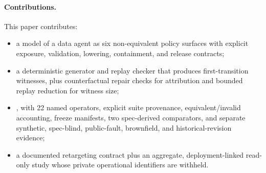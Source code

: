 \paragraph{Contributions.}
This paper contributes:

\begin{itemize}
  \item a model of a data agent as six non-equivalent policy surfaces with explicit exposure, validation, lowering, containment, and release contracts;
  \item a deterministic generator and replay checker that produces first-transition witnesses, plus counterfactual repair checks for attribution and bounded replay reduction for witness size;
  \item \bench, with 22 named operators, explicit suite provenance, equivalent/invalid accounting, freeze manifests, two spec-derived comparators, and separate synthetic, spec-blind, public-fault, brownfield, and historical-revision evidence;
  \item a documented retargeting contract plus an aggregate, deployment-linked read-only study whose private operational identifiers are withheld.
\end{itemize}
